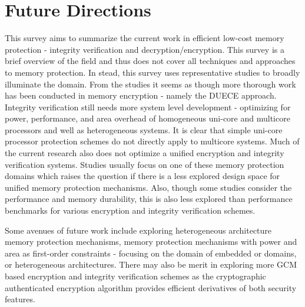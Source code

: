 \section{Future Directions}
\label{sec-conclusions}

This survey aims to summarize the current work in efficient low-cost memory
protection - integrity verification and decryption/encryption. This survey is a
brief overview of the field and thus does not cover all techniques and
approaches to memory protection. In stead, this survey uses representative
studies to broadly illuminate the domain. From the studies it seems as though
more thorough work has been conducted in memory encryption - namely the DUECE
approach. Integrity verification still needs more system level development -
optimizing for power, performance, and area overhead of homogeneous uni-core
and multicore processors and well as heterogeneous systems. It is clear that
simple uni-core processor protection schemes do not directly apply to multicore
systems. Much of the current research also does not optimize a unified
encryption and integrity verification systems. Studies usually focus on one of
these memory protection domains which raises the question if there is a less
explored design space for unified memory protection mechanisms. Also, though
some studies consider the performance and memory durability, this is also less
explored than performance benchmarks for various encryption and integrity
verification schemes.

Some avenues of future work include exploring heterogeneous architecture memory
protection mechanisms, memory protection mechanisms with power and area as
first-order constraints - focusing on the domain of embedded or  domains, or heterogeneous architectures. There may also be merit in
exploring more GCM based encryption and integrity verification schemes as the
cryptographic authenticated encryption algorithm provides efficient derivatives
of both security features.
